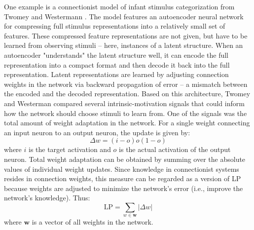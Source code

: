 One example is a connectionist model of infant stimulus categorization from Twomey and Westermann \cite{twomey_curiosity-based_2018}. The model features an autoencoder neural network for compressing full stimulus representations into a relatively small set of features. These compressed feature representations are not given, but have to be learned from observing stimuli -- here, instances of a latent structure. When an autoencoder "understands" the latent structure well, it can encode the full representation into a compact format and then decode it back into the full representation. Latent representations are learned by adjusting connection weights in the network via backward propagation of error -- a mismatch between the encoded and the decoded representation. Based on this architecture, Twomey and Westerman compared several intrinsic-motivation signals that could inform how the network should choose stimuli to learn from. One of the signals was the total amount of weight adaptation in the network. For a single weight connecting an input neuron to an output neuron, the update is given by: 
\begin{equation}
    \Delta w = (i - o)o(1-o)
\end{equation}
where $i$ is the target activation and $o$ is the actual activation of the output neuron. Total weight adaptation can be obtained by summing over the absolute values of individual weight updates. Since knowledge in connectionist systems resides in connection weights, this measure can be regarded as a version of \ac{LP} because weights are adjusted to minimize the network's error (i.e., improve the network's knowledge). Thus: 
\begin{equation}
    \mathrm{LP} = \sum_{w \in \bm{w}} |\Delta w|
\end{equation}
where $\bm{w}$ is a vector of all weights in the network.

